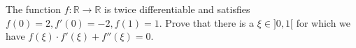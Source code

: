 The function \(f\colon  \mathbb{R}\to\mathbb{R}\) is twice differentiable and satisfies \(f(0)=2,f'(0)=-2,f(1)=1\).
Prove that there is a \(\xi \in ]0,1[\) for which we have \(f(\xi)\cdot f'(\xi)+f''(\xi)=0\).